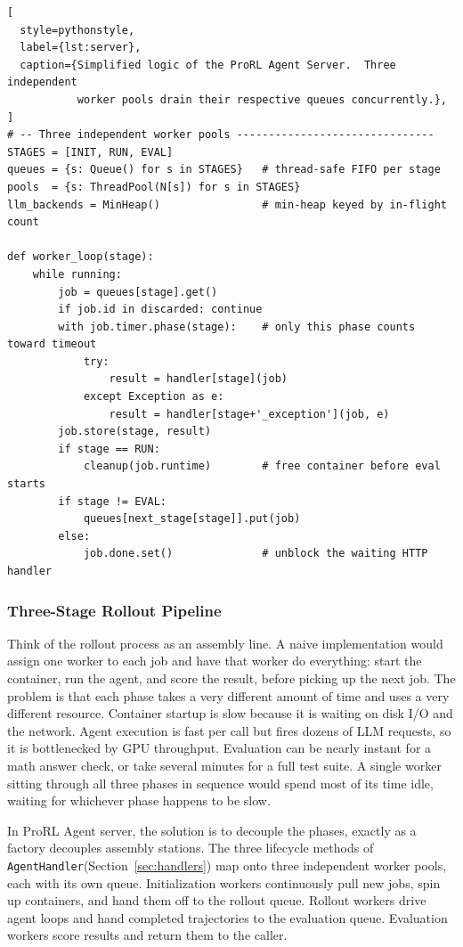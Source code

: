 \begin{lstlisting}[
  style=pythonstyle,
  label={lst:server},
  caption={Simplified logic of the ProRL Agent Server.  Three independent
           worker pools drain their respective queues concurrently.},
]
# -- Three independent worker pools -------------------------------
STAGES = [INIT, RUN, EVAL]
queues = {s: Queue() for s in STAGES}   # thread-safe FIFO per stage
pools  = {s: ThreadPool(N[s]) for s in STAGES}
llm_backends = MinHeap()                # min-heap keyed by in-flight count

def worker_loop(stage):
    while running:
        job = queues[stage].get()
        if job.id in discarded: continue
        with job.timer.phase(stage):    # only this phase counts toward timeout
            try:
                result = handler[stage](job)
            except Exception as e:
                result = handler[stage+'_exception'](job, e)
        job.store(stage, result)
        if stage == RUN:
            cleanup(job.runtime)        # free container before eval starts
        if stage != EVAL:
            queues[next_stage[stage]].put(job)
        else:
            job.done.set()              # unblock the waiting HTTP handler
\end{lstlisting} 

\subsubsection{Three-Stage Rollout Pipeline}
\label{sec:pipeline}

Think of the rollout process as an assembly line. A naive implementation would assign one worker to each job and have that worker do everything: start the container, run the agent, and score the result, before picking up the next job.
The problem is that each phase takes a very different amount of time and uses a very different resource.
Container startup is slow because it is waiting on disk I/O and the network.  Agent execution is fast per call but fires dozens of LLM requests, so it is bottlenecked by GPU throughput.
Evaluation can be nearly instant for a math answer check, or take several minutes for a full test suite.
A single worker sitting through all three phases in sequence would spend most of its time idle, waiting for whichever phase happens to be slow.

In ProRL Agent server, the solution is to decouple the phases, exactly as a factory decouples assembly stations.
The three lifecycle methods of \texttt{AgentHandler}(Section~\ref{sec:handlers}) map onto three independent worker pools, each with its own queue.
Initialization workers continuously pull new jobs, spin up containers, and hand them off to the rollout queue.
Rollout workers drive agent loops and hand completed trajectories to the evaluation queue.
Evaluation workers score results and return them to the caller. 

